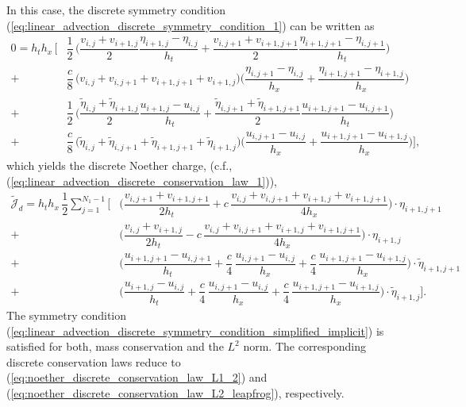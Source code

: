 \documentclass[12pt,a4paper,reqno]{article}
\begin{document}
In this case, the discrete symmetry condition (\ref{eq:linear_advection_discrete_symmetry_condition_1}) can be written as
\begingroup
\allowdisplaybreaks
\begin{align}\label{eq:linear_advection_discrete_symmetry_condition_simplified_implicit}
0 = h_{t} h_{x} \, \bigg[ &
\nonumber
\dfrac{1}{2} \, \bigg(
  \dfrac{v_{i, j  } + v_{i+1, j  }}{2} \dfrac{\eta_{i+1, j  } - \eta_{i, j  }}{h_{t}}
+ \dfrac{v_{i, j+1} + v_{i+1, j+1}}{2} \dfrac{\eta_{i+1, j+1} - \eta_{i, j+1}}{h_{t}}
\bigg) \\
\nonumber
+ &
\dfrac{c}{8} \, \bigg( v_{i,j} + v_{i,j+1} + v_{i+1,j+1} + v_{i+1,j} \bigg)
\bigg(
   \dfrac{\eta_{i,  j+1} - \eta_{i,  j  }}{h_{x}}
 + \dfrac{\eta_{i+1,j+1} - \eta_{i+1,j  }}{h_{x}}
\bigg) \\
\nonumber
+ &
\dfrac{1}{2} \, \bigg(
  \dfrac{\tilde{\eta}_{i, j  } + \tilde{\eta}_{i+1, j  }}{2} \dfrac{u_{i+1, j  } - u_{i, j  }}{h_{t}}
+ \dfrac{\tilde{\eta}_{i, j+1} + \tilde{\eta}_{i+1, j+1}}{2} \dfrac{u_{i+1, j+1} - u_{i, j+1}}{h_{t}}
\bigg) \\
+ &
\dfrac{c}{8} \, \bigg( \tilde{\eta}_{i,  j  } + \tilde{\eta}_{i,  j+1} + \tilde{\eta}_{i+1,j+1} + \tilde{\eta}_{i+1,j  } \bigg)
\bigg(
  \dfrac{u_{i,  j+1} - u_{i,  j}}{h_{x}}
+ \dfrac{u_{i+1,j+1} - u_{i+1,j}}{h_{x}}
\bigg)
\bigg] ,
\end{align}
\endgroup
which yields the discrete Noether charge, (c.f., (\ref{eq:linear_advection_discrete_conservation_law_1})),
\begingroup
\allowdisplaybreaks
\begin{align}\label{eq:linear_advection_discrete_conservation_law_simplified_implicit}
\tilde{\mathcal{J}}_{d} =
h_{t} h_{x} \, \dfrac{1}{2} \sum \limits_{j=1}^{N_{1}-1} \bigg[
\nonumber
  & \bigg( \dfrac{v_{i,  j+1} + v_{i+1,j+1}}{2 h_{t}} + c \, \dfrac{v_{i,j} + v_{i,j+1} + v_{i+1,j} + v_{i+1,j+1}}{4 h_{x}} \bigg) \cdot \eta_{i+1,j+1} \\
\nonumber
+ & \bigg( \dfrac{v_{i,  j  } + v_{i+1,j  }}{2 h_{t}} - c \, \dfrac{v_{i,j} + v_{i,j+1} + v_{i+1,j} + v_{i+1,j+1}}{4 h_{x}} \bigg) \cdot \eta_{i+1,j } \\
\nonumber
+ & \bigg( \dfrac{u_{i+1, j+1} - u_{i, j+1}}{h_{t}} + \dfrac{c}{4} \, \dfrac{u_{i,j+1} - u_{i,j}}{h_{x}} + \dfrac{c}{4} \, \dfrac{u_{i+1, j+1} - u_{i+1, j}}{h_{x}} \bigg) \cdot \tilde{\eta}_{i+1, j+1} \\
+ & \bigg( \dfrac{u_{i+1, j  } - u_{i, j  }}{h_{t}} + \dfrac{c}{4} \, \dfrac{u_{i,j+1} - u_{i,j}}{h_{x}} + \dfrac{c}{4} \, \dfrac{u_{i+1, j+1} - u_{i+1, j}}{h_{x}} \bigg) \cdot \tilde{\eta}_{i+1, j  }
\bigg] .
\end{align}
\endgroup
The symmetry condition (\ref{eq:linear_advection_discrete_symmetry_condition_simplified_implicit}) is satisfied for both, mass conservation and the $L^{2}$ norm. The corresponding discrete conservation laws reduce to (\ref{eq:noether_discrete_conservation_law_L1_2}) and (\ref{eq:noether_discrete_conservation_law_L2_leapfrog}), respectively.
\end{document}
